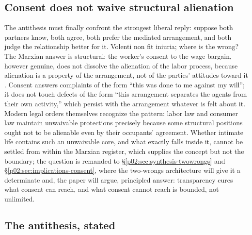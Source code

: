 \subsection{Consent does not waive structural alienation}
\label{p02:sec:marx-consent}

The antithesis must finally confront the strongest liberal reply: suppose both partners know, both agree, both prefer the mediated arrangement, and both judge the relationship better for it. Volenti non fit iniuria; where is the wrong? The Marxian answer is structural: the worker's consent to the wage bargain, however genuine, does not dissolve the alienation of the labor process, because alienation is a property of the arrangement, not of the parties' attitudes toward it \parencite{marx1844economic,jaeggi2014alienation}. Consent answers complaints of the form ``this was done to me against my will''; it does not touch defects of the form ``this arrangement separates the agents from their own activity,'' which persist with the arrangement whatever is felt about it. Modern legal orders themselves recognize the pattern: labor law and consumer law maintain unwaivable protections precisely because some structural positions ought not to be alienable even by their occupants' agreement. Whether intimate life contains such an unwaivable core, and what exactly falls inside it, cannot be settled from within the Marxian register, which supplies the concept but not the boundary; the question is remanded to \S\ref{p02:sec:synthesis-twowrongs} and \S\ref{p02:sec:implications-consent}, where the two-wrongs architecture will give it a determinate and, the paper will argue, principled answer: transparency cures what consent can reach, and what consent cannot reach is bounded, not unlimited.

\subsection{The antithesis, stated}
\label{p02:sec:marx-stated}

